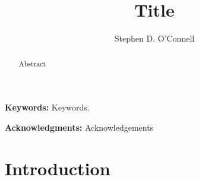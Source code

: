 \documentclass[12pt,letterpaper,oneside]{article}
\begin{document}
\title{Title}
\author{Stephen D. O'Connell}

  
\maketitle 
\begin{abstract}
\singlespace \noindent Abstract
\end{abstract}

\textbf{Keywords:} 
Keywords.

\singlespace 
\textbf{Acknowledgments:} Acknowledgements

\newpage
\doublespace
\section{Introduction}


\newpage


\end{document}
